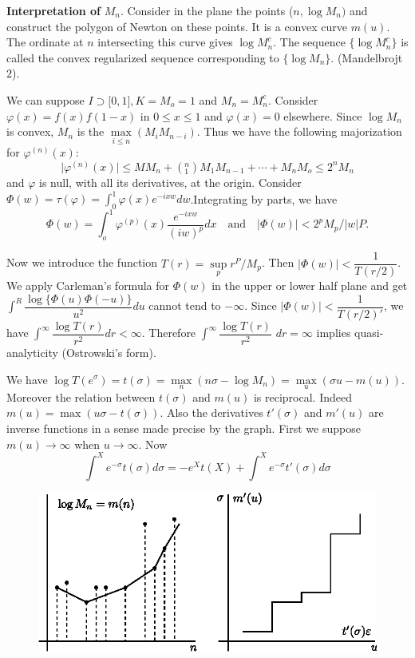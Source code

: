 \noindent
\textbf{Interpretation of } $M_n$. Consider in the plane the points
($n, \log M_n)$ and construct the polygon of Newton on these
points. It is a convex curve $m(u)$. The ordinate at $n$ intersecting
this curve gives $\log M^c_n$. The sequence $\{\log M^c_n \}$ is
called the convex regularized sequence corresponding to $\{\log
M_n\}$. (Mandelbrojt $2$). 

\begin{proofofthm*}%
 We can suppose $I \supset \big [ 0, 1\big], K = M_o = 1$ and $M_n =
 M^c_n$. Consider $\varphi (x) = f(x) f(1-x)$ in $0 \le x \le 1$ and
 $\varphi (x) = 0$ elsewhere. Since $\log M_n$ is convex, $M_n$ is
 the $\max \limits_{i \le n} (M_i M_{n - i})$. Thus we have the
 following majorization for $\varphi^{(n)} (x)$: 
 $$
 \big | \varphi^{(n)} (x) \big | \le M M_n + (^n_1) M_1 M_{n-1} +
 \cdots + M_n M_o \le 2^n M_n 
 $$
 and $\varphi$ is null, with all its derivatives, at the
 origin. Consider $\Phi (w) = \tau (\varphi) = \int^1_0 \varphi (x)
 e^{-ixw} dw$.\pageoriginale Integrating by parts, we have 
 $$
 \Phi (w) = \int^1_o
 \varphi^{(p)}(x) \dfrac{e^{- ixw}}{(iw)^p} dx \quad
 \text{and}\quad \big | \Phi (w) \big | < 2^p M_p \big / | w | P.
 $$ 
\end{proofofthm*}

Now we introduce the function $T(r) = \sup\limits_{p} r^P/M_p$. Then
$\big | \Phi (w) \big | < \dfrac{1}{T (r/2)}$. We apply Carleman's
formula for $\Phi (w)$ in the upper or lower half plane and get
$\int^R \dfrac{\log \{ \Phi (u) \Phi (-u)\}}{u^2} du$ cannot tend to
$- \infty$. Since $\big | \Phi (w) \big | < \dfrac{1}{T(r/2)'}$, we have
$\int^\infty \dfrac{\log T(r)}{r^2} dr < \infty$. Therefore
$\int^\infty \dfrac{\log T(r)}{r^2}$ $dr = \infty$ implies
quasi-analyticity (Ostrowski's form). 

We have $\log T(e^\sigma) = t (\sigma) = \max\limits_{n} (n \sigma -
\log M_n) = \max\limits_{u} (\sigma u - m (u))$. Moreover the relation
between $t(\sigma)$ and $m(u) $ is reciprocal. Indeed\break $m(u
) = \max (u \sigma - t(\sigma)) $. Also the derivatives $t' (\sigma)$
and $m'(u)$ are inverse functions in a sense made precise by the
graph. First we suppose $m(u) \to \infty$ when $u \to \infty$. Now 
$$
\int^X e^{- \sigma} t (\sigma) d \sigma = - e^X t(X) + \int^X e^{-
 \sigma} t' (\sigma) d \sigma 
$$ 
\begin{figure}[H]
 \centerline{\includegraphics{vol15-figures/fig15-21.eps}}
\end{figure}

